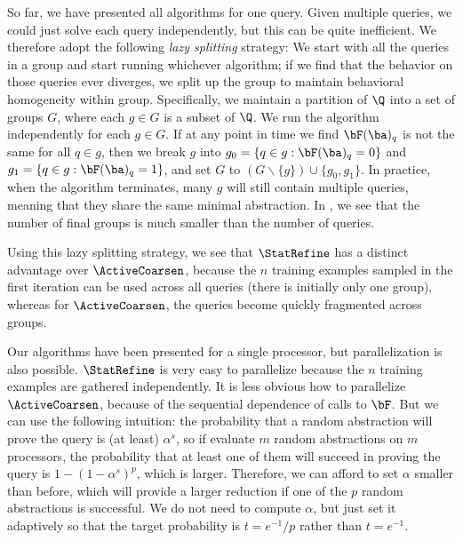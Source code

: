 
So far, we have presented all algorithms for one query.
Given multiple queries, we could just solve each query independently,
but this can be quite inefficient.
We therefore adopt the following {\em lazy splitting} strategy:
We start with all the queries in a group and start running whichever algorithm;
if we find that the behavior on those queries ever diverges,
we split up the group to maintain behavioral homogeneity within group.
Specifically, we maintain a partition of $\Q$ into a set of groups $G$,
where each $g \in G$ is a subset of $\Q$.
We run the algorithm independently for each $g \in G$.
If at any point in time we find $\bF(\ba)_q$ is not the same for all $q \in g$,
then we break $g$ into
$g_0 = \{ q \in g : \bF(\ba)_q = 0 \}$ and
$g_1 = \{ q \in g : \bF(\ba)_q = 1 \}$,
and set $G$ to $(G \backslash \{ g \}) \cup \{ g_0, g_1 \}$.
In practice, when the algorithm terminates,
many $g$ will still contain multiple queries,
meaning that they share the same minimal abstraction.
In , we see that the number of final groups is much smaller than
the number of queries.

Using this lazy splitting strategy, we see that $\StatRefine$ has a distinct
advantage over $\ActiveCoarsen$, because the $n$ training
examples sampled in the first iteration can be used across all queries (there
is initially only one group), whereas for $\ActiveCoarsen$, the queries become
quickly fragmented across groups.

Our algorithms have been presented for a single processor,
but parallelization is also possible.
$\StatRefine$ is very easy to parallelize because the $n$ training examples
are gathered independently.
It is less obvious how to parallelize $\ActiveCoarsen$, because of the sequential dependence of calls to $\bF$.
But we can use the following intuition:
the probability that a random abstraction will prove the query is (at least) $\alpha^s$,
so if evaluate $m$ random abstractions on $m$ processors,
the probability that at least one of them will succeed in proving the query is
$1-(1-\alpha^s)^p$, which is larger.
Therefore, we can afford to set $\alpha$ smaller than before, which will provide a
larger reduction if one of the $p$ random abstractions is successful.
We do not need to compute $\alpha$,
but just set it adaptively so that the target probability is
$t = e^{-1}/p$ rather than $t=e^{-1}$.


